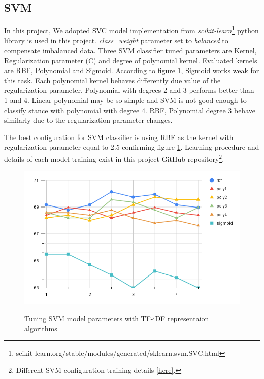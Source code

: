 \subsection{SVM}
In this project, We adopted SVC model implementation from \textit{scikit-learn}\footnote{scikit-learn.org/stable/modules/generated/sklearn.svm.SVC.html} python library is used in this project. \textit{class\_weight} parameter set to \textit{balanced} to compensate imbalanced data. Three SVM classifier tuned parameters  are Kernel, Regularization parameter (C) and degree of polynomial kernel. Evaluated kernels are RBF, Polynomial and Sigmoid. According to figure \ref{fig:svm}, Sigmoid works weak for this task. Each polynomial kernel behaves differently due value of the regularization parameter. Polynomial with degrees 2 and 3 performs better than 1 and 4. Linear polynomial may be so simple and SVM is not good enough to classify stance with polynomial with degree 4. RBF, Polynomial degree 3 behave similarly due to the regularization parameter changes. 

The best configuration for SVM classifier is using RBF as the kernel with regularization parameter equal to 2.5 confirming figure \ref{fig:svm}. Learning procedure and details of each model training exist in this project GitHub repository\footnote{Different SVM configuration training details \href{https://github.com/mahsaghn/stance\_detection/tree/main/selected\_outputs/machinelearning/svm}{[here]}.}.

\begin{figure}%
	\centering
	{\includegraphics[width=12.5cm]{statistics/svm.png} }
	\caption{Tuning SVM model parameters with TF-iDF representaion algorithms}%
	\label{fig:svm}%
\end{figure}


